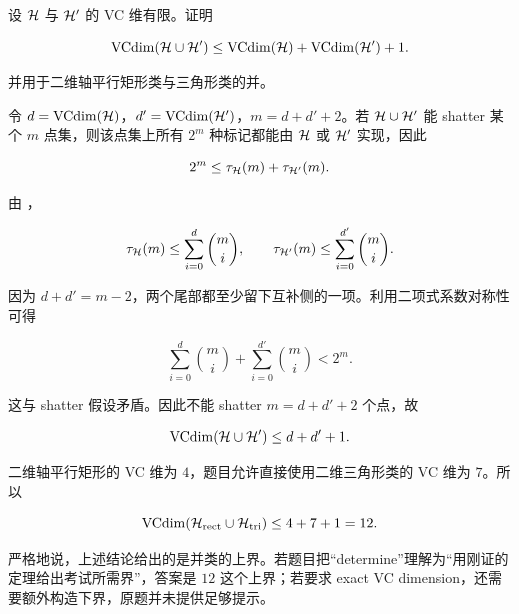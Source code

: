 \begin{examproblem}[A3：并类的 VC 维]
设 \(\mathcal{H}\) 与 \(\mathcal{H}'\) 的 VC 维有限。证明

\[
  \operatorname{VCdim}(\mathcal{H}\cup\mathcal{H}')
  \le
  \operatorname{VCdim}(\mathcal{H})
  +
  \operatorname{VCdim}(\mathcal{H}')
  +1.
\]

并用于二维轴平行矩形类与三角形类的并。
\end{examproblem}

\solution
令 \(d=\operatorname{VCdim}(\mathcal{H})\)，\(d'=\operatorname{VCdim}(\mathcal{H}')\)，\(m=d+d'+2\)。若 \(\mathcal{H}\cup\mathcal{H}'\) 能 shatter 某个 \(m\) 点集，则该点集上所有 \(2^m\) 种标记都能由 \(\mathcal{H}\) 或 \(\mathcal{H}'\) 实现，因此

\[
  2^m
  \le
  \tau_{\mathcal{H}}(m)+\tau_{\mathcal{H}'}(m).
\]

由 ，

\[
  \tau_{\mathcal{H}}(m)
  \le
  \sum_{i=0}^{d}\binom{m}{i},
  \qquad
  \tau_{\mathcal{H}'}(m)
  \le
  \sum_{i=0}^{d'}\binom{m}{i}.
\]

因为 \(d+d'=m-2\)，两个尾部都至少留下互补侧的一项。利用二项式系数对称性可得

\[
  \sum_{i=0}^{d}\binom{m}{i}
  +
  \sum_{i=0}^{d'}\binom{m}{i}
  <
  2^m.
\]

这与 shatter 假设矛盾。因此不能 shatter \(m=d+d'+2\) 个点，故

\[
  \operatorname{VCdim}(\mathcal{H}\cup\mathcal{H}')
  \le d+d'+1.
\]

二维轴平行矩形的 VC 维为 \(4\)，题目允许直接使用二维三角形类的 VC 维为 \(7\)。所以

\[
  \operatorname{VCdim}(\mathcal{H}_{\mathrm{rect}}\cup\mathcal{H}_{\mathrm{tri}})
  \le 4+7+1=12.
\]

\examnote
严格地说，上述结论给出的是并类的上界。若题目把“determine”理解为“用刚证的定理给出考试所需界”，答案是 \(12\) 这个上界；若要求 exact VC dimension，还需要额外构造下界，原题并未提供足够提示。

